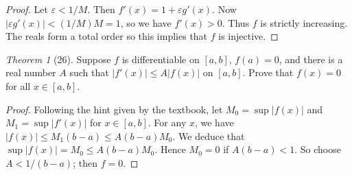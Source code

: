 \documentclass[12pt]{article}
\theoremstyle{remark}
\theoremstyle{named}
\newtheorem*{theorem}{Theorem}
\newcommand{\e}{\varepsilon}
\begin{document}
\begin{proof}
    Let \(\e < 1 / M\). Then \(f'(x) = 1 + \e g'(x)\). Now \(|\e g'(x)| < (1/M) M = 1\), so we have \(f'(x) > 0\). Thus \(f\) is strictly increasing. The reals form a total order so this implies that \(f\) is injective.
\end{proof}

\begin{theorem}[26]
    Suppose \(f\) is differentiable on \([a, b]\), \(f(a) = 0\), and there is a real number \(A\) such that \(|f'(x)| \le A|f(x)|\) on \([a, b]\). Prove that \(f(x) = 0\) for all \(x \in [a, b]\). 
\end{theorem}

\begin{proof}
    Following the hint given by the textbook, let \(M_0 = \sup |f(x)|\) and \(M_1 = \sup |f'(x)|\) for \(x \in [a, b]\). For any \(x\), we have \(|f(x)| \le M_1(b - a) \le A(b - a)M_0\). We deduce that \(\sup |f(x)| = M_0 \le A(b - a)M_0\). Hence \(M_0 = 0\) if \(A(b - a) < 1\). So choose \(A < 1/ (b - a)\); then \(f = 0\).
\end{proof}
\end{document}
